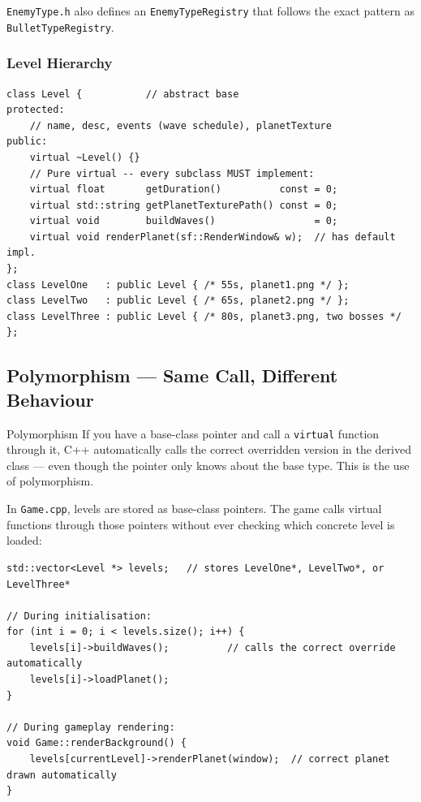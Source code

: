 \documentclass[11pt]{article}
\begin{document}
\texttt{EnemyType.h} also defines an \texttt{EnemyTypeRegistry} that follows
the exact pattern as \texttt{BulletTypeRegistry}.

\subsubsection{Level Hierarchy}

\begin{lstlisting}[caption={Level abstract base class skeleton (Level.h)}]
class Level {           // abstract base
protected:
    // name, desc, events (wave schedule), planetTexture
public:
    virtual ~Level() {}
    // Pure virtual -- every subclass MUST implement:
    virtual float       getDuration()          const = 0;
    virtual std::string getPlanetTexturePath() const = 0;
    virtual void        buildWaves()                 = 0;
    virtual void renderPlanet(sf::RenderWindow& w);  // has default impl.
};
class LevelOne   : public Level { /* 55s, planet1.png */ };
class LevelTwo   : public Level { /* 65s, planet2.png */ };
class LevelThree : public Level { /* 80s, planet3.png, two bosses */ };
\end{lstlisting}

\subsection{Polymorphism --- Same Call, Different Behaviour}

\begin{conceptbox}{Polymorphism}
If you have a base-class pointer and call a
\texttt{virtual} function through it, C++ automatically calls the correct
overridden version in the derived class --- even though the pointer only knows
about the base type. This is the use of polymorphism.
\end{conceptbox}

In \texttt{Game.cpp}, levels are stored as base-class pointers. The game
calls virtual functions through those pointers without ever checking which
concrete level is loaded:

\begin{lstlisting}[caption={Polymorphic level calls in Game.cpp}]
std::vector<Level *> levels;   // stores LevelOne*, LevelTwo*, or LevelThree*

// During initialisation:
for (int i = 0; i < levels.size(); i++) {
    levels[i]->buildWaves();          // calls the correct override automatically
    levels[i]->loadPlanet();
}

// During gameplay rendering:
void Game::renderBackground() {
    levels[currentLevel]->renderPlanet(window);  // correct planet drawn automatically
}
\end{lstlisting}
\end{document}
